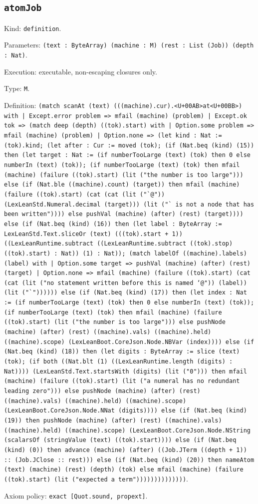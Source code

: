 \documentclass[11pt]{article}
\begin{document}
\subsection*{\texttt{atomJob}}
\noindent Kind: \texttt{definition}.\par
\noindent Parameters: \texttt{(text : ByteArray) (machine : M) (rest : List (Job)) (depth : Nat)}.\par
\noindent Execution: executable, non-escaping closures only.\par
\noindent Type: \texttt{M}.\par
\noindent Definition: \texttt{(match scanAt (text) (((machine).cur).<U+00AB>at<U+00BB>) with | Except.error problem => mfail (machine) (problem) | Except.ok tok => (match deep (depth) ((tok).start) with | Option.some problem => mfail (machine) (problem) | Option.none => (let kind : Nat := (tok).kind; (let after : Cur := moved (tok); (if (Nat.beq (kind) (15)) then (let target : Nat := (if numberTooLarge (text) (tok) then 0 else numberIn (text) (tok)); (if numberTooLarge (text) (tok) then mfail (machine) (failure ((tok).start) (lit ("the number is too large"))) else (if (Nat.ble ((machine).count) (target)) then mfail (machine) (failure ((tok).start) (cat (cat (lit ("`@")) (LexLeanStd.Numeral.decimal (target))) (lit ("` is not a node that has been written")))) else pushVal (machine) (after) (rest) (target)))) else (if (Nat.beq (kind) (16)) then (let label : ByteArray := LexLeanStd.Text.sliceOr (text) (((tok).start + 1)) ((LexLeanRuntime.subtract ((LexLeanRuntime.subtract ((tok).stop) ((tok).start) : Nat)) (1) : Nat)); (match labelOf ((machine).labels) (label) with | Option.some target => pushVal (machine) (after) (rest) (target) | Option.none => mfail (machine) (failure ((tok).start) (cat (cat (lit ("no statement written before this is named `@")) (label)) (lit ("`")))))) else (if (Nat.beq (kind) (17)) then (let index : Nat := (if numberTooLarge (text) (tok) then 0 else numberIn (text) (tok)); (if numberTooLarge (text) (tok) then mfail (machine) (failure ((tok).start) (lit ("the number is too large"))) else pushNode (machine) (after) (rest) ((machine).vals) ((machine).held) ((machine).scope) (LexLeanBoot.CoreJson.Node.NBVar (index)))) else (if (Nat.beq (kind) (18)) then (let digits : ByteArray := slice (text) (tok); (if both ((Nat.blt (1) ((LexLeanRuntime.length (digits) : Nat)))) (LexLeanStd.Text.startsWith (digits) (lit ("0"))) then mfail (machine) (failure ((tok).start) (lit ("a numeral has no redundant leading zero"))) else pushNode (machine) (after) (rest) ((machine).vals) ((machine).held) ((machine).scope) (LexLeanBoot.CoreJson.Node.NNat (digits)))) else (if (Nat.beq (kind) (19)) then pushNode (machine) (after) (rest) ((machine).vals) ((machine).held) ((machine).scope) (LexLeanBoot.CoreJson.Node.NString (scalarsOf (stringValue (text) ((tok).start)))) else (if (Nat.beq (kind) (0)) then advance (machine) (after) ((Job.JTerm ((depth + 1)) :: (Job.JClose :: rest))) else (if (Nat.beq (kind) (20)) then nameAtom (text) (machine) (rest) (depth) (tok) else mfail (machine) (failure ((tok).start) (lit ("expected a term"))))))))))))))}.\par
\noindent Axiom policy: \texttt{exact [Quot.sound, propext]}.\par
\end{document}
